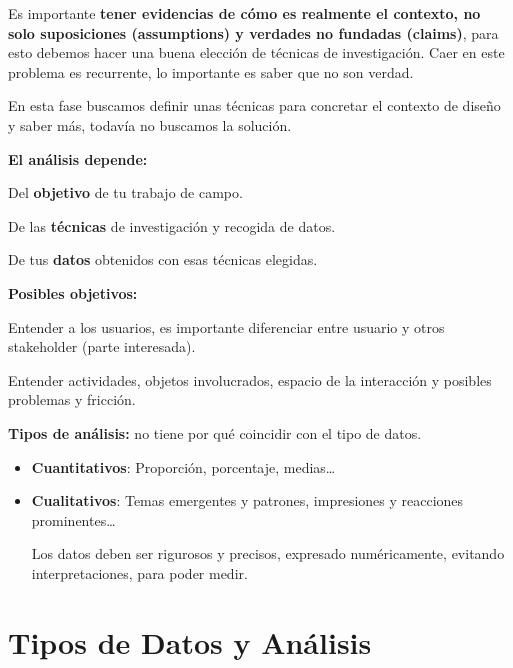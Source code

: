\documentclass[12pt, twoside, openright]{report} %
\begin{document}
Es importante \textbf{tener evidencias de cómo es realmente el contexto,
no solo suposiciones (assumptions) y verdades no fundadas (claims)},
para esto debemos hacer una buena elección de técnicas de investigación.
Caer en este problema es recurrente, lo importante es saber que no son
verdad.

En esta fase buscamos definir unas técnicas para concretar el contexto
de diseño y saber más, todavía no buscamos la solución.

\textbf{El análisis depende:}

Del \textbf{objetivo} de tu trabajo de campo.

De las \textbf{técnicas} de investigación y recogida de datos.

De tus \textbf{datos} obtenidos con esas técnicas elegidas.

\textbf{Posibles objetivos:}

Entender a los usuarios, es importante diferenciar entre usuario y otros
stakeholder (parte interesada).

Entender actividades, objetos involucrados, espacio de la interacción y
posibles problemas y fricción.

\textbf{Tipos de análisis:} no tiene por qué coincidir con el tipo de
datos.

\begin{itemize}
\item
  \textbf{Cuantitativos}: Proporción, porcentaje, medias\ldots{}
\item
  \textbf{Cualitativos}: Temas emergentes y patrones, impresiones y
  reacciones prominentes\ldots{}

  Los datos deben ser rigurosos y precisos, expresado numéricamente,
  evitando interpretaciones, para poder medir.
\end{itemize}

\section{Tipos de Datos y
Análisis}
\end{document}
